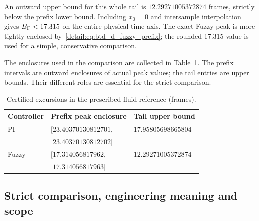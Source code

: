 An outward upper bound for this whole tail is
$12.29271005372874$ frames, strictly below the prefix lower bound.
Including $x_0=0$ and intersample interpolation gives
$B_{\rm F}<17.315$ on the entire physical time axis. The exact Fuzzy
peak is more tightly enclosed by~\eqref{detail:eq:btd_d_fuzzy_prefix}; the
rounded 17.315 value is used for a simple, conservative comparison.

The enclosures used in the comparison are collected in
Table~\ref{detail:tab:btd_prefix_tail}. The prefix intervals are outward
enclosures of actual peak values; the tail entries are upper bounds.
Their different roles are essential for the strict comparison.
\begin{table}[t]
\caption{Certified excursions in the prescribed fluid reference (frames).}
\label{detail:tab:btd_prefix_tail}
\centering\small
\begin{tabular}{@{}lll@{}}
\toprule
Controller & Prefix peak enclosure & Tail upper bound\\
\midrule
PI & $[23.40370130812701,$ & $17.95805698665804$\\
   & $\phantom{[}23.40370130812702]$ & \\
Fuzzy & $[17.314056817962,$ & $12.29271005372874$\\
      & $\phantom{[}17.314056817963]$ & \\
\bottomrule
\end{tabular}
\end{table}

\subsection{Strict comparison, engineering meaning and scope}
\label{detail:subsec:btd_comparative}


